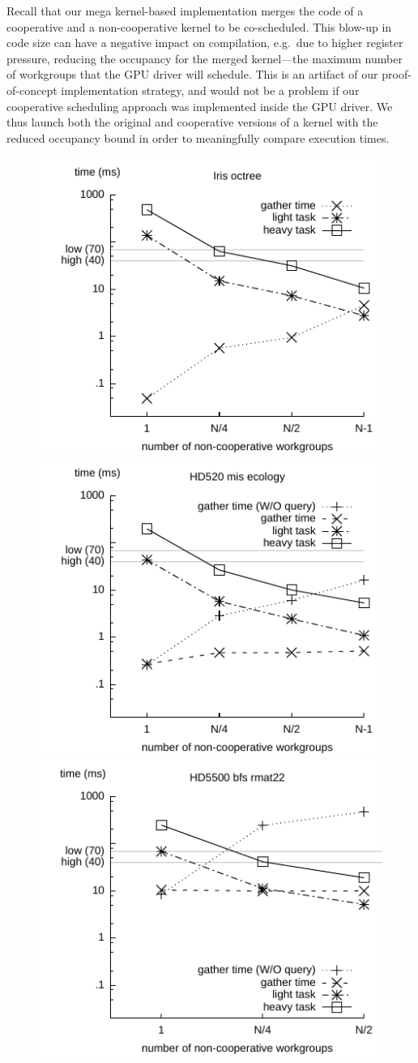 \documentclass[parskip=half,sigconf,review, anonymous=true, acmcopyrightmode=none]{acmart}
\begin{document}
Recall that our mega kernel-based implementation merges the code of a
cooperative and a non-cooperative kernel to be co-scheduled.  This
blow-up in code size can have a negative impact on compilation, e.g.\
due to higher register pressure, reducing the occupancy for the merged
kernel---the maximum number of workgroups that the GPU driver will
schedule.  This is an artifact of our proof-of-concept implementation
strategy, and would not be a problem if our cooperative scheduling
approach was implemented inside the GPU driver.  We thus launch both the
original and cooperative versions of a kernel with the reduced occupancy
bound in order to meaningfully compare execution times.

\begin{figure}
\includegraphics[width=.67\columnwidth]{iris_octree_NA.pdf}
\includegraphics[width=.67\columnwidth]{hd520_mis_ecology.pdf}
\includegraphics[width=.67\columnwidth]{hd5500_bfs_rmat22.pdf}

\end{figure}
\end{document}
